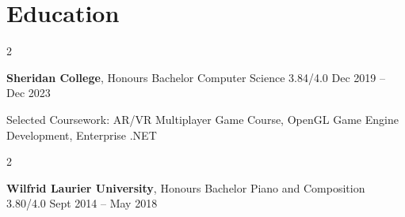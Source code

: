\documentclass[10pt, letterpaper]{article}
\newenvironment{twocolentry}[2][]{
    \onecolentry
    \def\secondColumn{#2}
    \setcolumnwidth{\fill, 4.5 cm}
    \begin{paracol}{2}
}{
    \switchcolumn \raggedleft \secondColumn
    \end{paracol}
    \endonecolentry
} %
\begin{document}
    \section{Education}
        \begin{twocolentry}{
            Dec 2019 – Dec 2023
        }
        \textbf{Sheridan College}, Honours Bachelor Computer Science 3.84/4.0\end{twocolentry}
        {Selected Coursework:} AR/VR Multiplayer Game Course, OpenGL Game Engine Development, Enterprise .NET 
        \vspace{0.10 cm}

        \begin{twocolentry}{
            Sept 2014 – May 2018
        }
       \vspace{0.10 cm}
        \textbf{Wilfrid Laurier University}, Honours Bachelor Piano and Composition 3.80/4.0\end{twocolentry}
        
\end{document}

